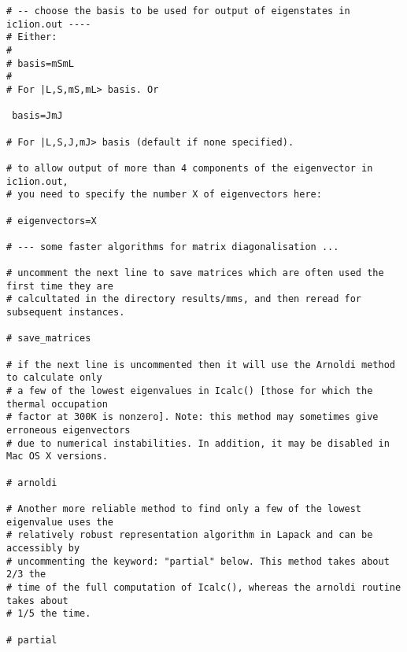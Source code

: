 {\begin{verbatim}
# -- choose the basis to be used for output of eigenstates in ic1ion.out ----
# Either:
#
# basis=mSmL
#
# For |L,S,mS,mL> basis. Or
 
 basis=JmJ

# For |L,S,J,mJ> basis (default if none specified).

# to allow output of more than 4 components of the eigenvector in ic1ion.out, 
# you need to specify the number X of eigenvectors here:

# eigenvectors=X

# --- some faster algorithms for matrix diagonalisation ...

# uncomment the next line to save matrices which are often used the first time they are
# calcultated in the directory results/mms, and then reread for subsequent instances.

# save_matrices

# if the next line is uncommented then it will use the Arnoldi method to calculate only 
# a few of the lowest eigenvalues in Icalc() [those for which the thermal occupation
# factor at 300K is nonzero]. Note: this method may sometimes give erroneous eigenvectors
# due to numerical instabilities. In addition, it may be disabled in Mac OS X versions.

# arnoldi

# Another more reliable method to find only a few of the lowest eigenvalue uses the 
# relatively robust representation algorithm in Lapack and can be accessibly by 
# uncommenting the keyword: "partial" below. This method takes about 2/3 the
# time of the full computation of Icalc(), whereas the arnoldi routine takes about
# 1/5 the time.

# partial


\end{verbatim}}
